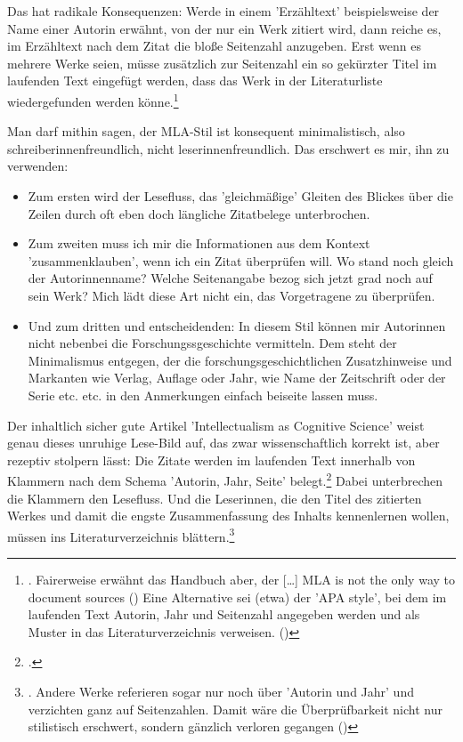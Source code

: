 Das hat radikale Konsequenzen: Werde in einem 'Erzähltext' beispielsweise der Name einer Autorin erwähnt, von der nur ein Werk zitiert wird, dann reiche es, im Erzähltext nach dem Zitat die bloße Seitenzahl anzugeben. Erst wenn es mehrere Werke seien, müsse zusätzlich zur Seitenzahl ein so gekürzter Titel im laufenden Text eingefügt werden, dass das Werk in der Literaturliste wiedergefunden werden könne.\footnote{\cite[vgl.][127]{ModLanAss2009a}. Fairerweise erwähnt das Handbuch aber, der \glqq{}[\ldots] MLA is not the only way to document sources\grqq{} (\cite[vgl.][127]{ModLanAss2009a}) Eine Alternative sei (etwa) der 'APA style', bei dem im laufenden Text Autorin, Jahr und Seitenzahl angegeben werden und als Muster in das Literaturverzeichnis
verweisen. (\cite[vgl.][S. 127f]{ModLanAss2009a})}

Man darf mithin sagen, der MLA-Stil ist konsequent minimalistisch, also schreiberinnenfreundlich, nicht leserinnenfreundlich. Das erschwert es mir, ihn zu verwenden:

\begin{itemize}
  \item Zum ersten wird der Lesefluss, das 'gleichmäßige' Gleiten des Blickes
  über die Zeilen durch oft eben doch längliche Zitatbelege unterbrochen.
  \item Zum zweiten muss ich mir die Informationen aus dem Kontext
  'zusammenklauben', wenn ich ein Zitat überprüfen will. Wo stand noch gleich
  der Autorinnenname? Welche Seitenangabe bezog sich jetzt grad noch auf sein Werk?
  Mich lädt diese Art nicht ein, das Vorgetragene zu überprüfen.
  \item Und zum dritten und entscheidenden: In diesem Stil können mir Autorinnen
  nicht nebenbei die Forschungssgeschichte vermitteln. Dem steht der Minimalismus entgegen, der die forschungsgeschichtlichen Zusatzhinweise und Markanten wie Verlag, Auflage oder Jahr, wie Name der Zeitschrift oder der Serie etc. etc. in den Anmerkungen einfach beiseite lassen muss.
\end{itemize}

Der inhaltlich sicher gute Artikel 'Intellectualism as Cognitive Science' weist genau dieses unruhige Lese-Bild auf, das zwar wissenschaftlich korrekt ist, aber rezeptiv stolpern lässt: Die Zitate werden im laufenden Text innerhalb von Klammern nach dem Schema 'Autorin, Jahr, Seite' belegt.\footcite[vgl.][25]{RotCum2011a} Dabei unterbrechen die Klammern den Lesefluss. Und die Leserinnen, die den Titel des zitierten Werkes und damit die engste Zusammenfassung des Inhalts kennenlernen wollen, müssen ins Literaturverzeichnis blättern.\footnote{\cite[vgl.][S. 38f]{RotCum2011a}. Andere Werke referieren sogar nur noch über 'Autorin und Jahr' und verzichten ganz auf Seitenzahlen. Damit wäre die Überprüfbarkeit nicht nur stilistisch erschwert, sondern gänzlich verloren gegangen (\cite[vgl. z.B.][151]{Bechtel2011a})}

